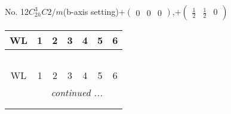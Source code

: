 \documentclass[fleqn,9pt,landscape]{jsarticle}
\begin{document}
\newpage
No. 12\quad$C_{2h}^{3}$\quad$C2/m$\quad(b-axis setting)\quad[ monoclinic ]\quad$+\begin{pmatrix} 0 & 0 & 0 \end{pmatrix}$,\quad $+\begin{pmatrix} \frac{1}{2} & \frac{1}{2} & 0 \end{pmatrix}$
\begin{center}
\renewcommand{\arraystretch}{1.2}
\begin{longtable}{ccccccc}
 \hline \hline
WL & 1 & 2 & 3 & 4 & 5 & 6 \\ \hline \endfirsthead

\multicolumn{6}{l}{\tablename\ \thetable{}} \\
 \hline \hline
WL & 1 & 2 & 3 & 4 & 5 & 6 \\ \hline \endhead

 \hline \hline
\multicolumn{6}{r}{\footnotesize\it continued ...} \\ \endfoot

 \hline \hline
\multicolumn{6}{r}{} \\ \endlastfoot


\end{longtable}
\end{center}
\end{document}
